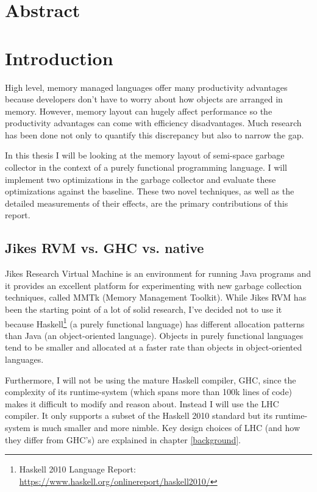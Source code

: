 \documentclass[a4paper,oneside]{memoir}
\begin{document}


\chapter*{Abstract}



\newpage

\tableofcontents*

\chapter{Introduction}
High level, memory managed languages offer many productivity advantages because
developers don't have to worry about how objects are arranged in memory. However,
memory layout can hugely affect performance so the productivity advantages can
come with efficiency disadvantages. Much research has been done not only to
quantify this discrepancy but also to narrow the gap.

In this thesis I will be looking at the memory layout of semi-space garbage
collector in the context of a purely functional programming language.
I will implement two optimizations in the garbage collector and evaluate these
optimizations against the baseline. These two novel techniques, as well as the
detailed measurements of their effects, are the primary contributions of this
report.

\section{Jikes RVM vs. GHC vs. native}

Jikes Research Virtual Machine is an environment for running Java programs
and it provides an excellent platform for experimenting with new garbage
collection techniques, called MMTk (Memory Management Toolkit).\cite{Blackburn:2004}
While Jikes RVM has been the starting point of a lot of solid research, I've
decided not to use it because
Haskell\footnote{Haskell 2010 Language Report: \url{https://www.haskell.org/onlinereport/haskell2010/}}
 (a purely functional language) has
different allocation patterns than Java (an object-oriented language).
\cite{Blackburn:2008,Hertz05garbagecollection,Hertz:2005,mc2}
Objects in purely functional languages tend to be smaller and allocated at a
faster rate than objects in object-oriented languages.

Furthermore, I will not be using the mature Haskell compiler, GHC, since the
complexity of its runtime-system (which spans more than 100k lines of code)
makes it difficult to modify and reason about. Instead I will use the LHC
compiler. It only supports a subset of the Haskell 2010 standard but its
runtime-system is much smaller and more nimble. Key design choices of
LHC (and how they differ from GHC's) are explained in chapter \ref{background}.
\end{document}
